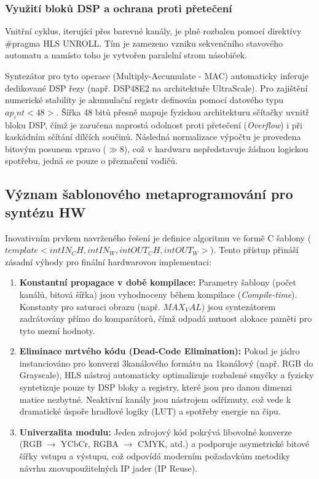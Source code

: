 \subsubsection{Využití bloků DSP a ochrana proti přetečení
}
Vnitřní cyklus, iterující přes barevné kanály, je plně rozbalen pomocí direktivy \#pragma HLS UNROLL. Tím je zamezeno vzniku sekvenčního stavového automatu a namísto toho je vytvořen paralelní strom násobiček.


Syntezátor pro tyto operace (Multiply-Accumulate - MAC) automaticky inferuje dedikované DSP řezy (např. DSP48E2 na architektuře UltraScale\+). Pro zajištění numerické stability je akumulační registr definován pomocí datového typu $ap_int<48>$. Šířka 48 bitů přesně mapuje fyzickou architekturu sčítačky uvnitř bloku DSP, čímž je zaručena naprostá odolnost proti přetečení (\textit{Overflow}) i při kaskádním sčítání dílčích součinů. Následná normalizace výpočtu je provedena bitovým posunem vpravo ($\gg 8$), což v hardwaru nepředstavuje žádnou logickou spotřebu, jedná se pouze o přeznačení vodičů.

\subsection{Význam šablonového metaprogramování pro syntézu HW}
Inovativním prvkem navrženého řešení je definice algoritmu ve formě C\+\+ šablony ($template <int IN_CH, int IN_W, int OUT_CH, int OUT_W>$). Tento přístup přináší zásadní výhody pro finální hardwarovou implementaci:

\begin{enumerate}
    \item \textbf{Konstantní propagace v době kompilace:} Parametry šablony (počet kanálů, bitová šířka) jsou vyhodnoceny během kompilace (\textit{Compile-time}). Konstanty pro saturaci obrazu (např. $MAX_VAL$) jsou syntezátorem zadrátovány přímo do komparátorů, čímž odpadá nutnost alokace paměti pro tyto mezní hodnoty.
    \item \textbf{Eliminace mrtvého kódu (Dead-Code Elimination):} Pokud je jádro instanciováno pro konverzi 3kanálového formátu na 1kanálový (např. RGB do Grayscale), HLS nástroj automaticky optimalizuje rozbalené smyčky a fyzicky syntetizuje pouze ty DSP bloky a registry, které jsou pro danou dimenzi matice nezbytné. Neaktivní kanály jsou nástrojem odříznuty, což vede k dramatické úspoře hradlové logiky (LUT) a spotřeby energie na čipu.
    \item \textbf{Univerzalita modulu:} Jeden zdrojový kód pokrývá libovolné konverze (RGB $\rightarrow$ YCbCr, RGBA $\rightarrow$ CMYK, atd.) a podporuje asymetrické bitové šířky vstupu a výstupu, což odpovídá moderním požadavkům metodiky návrhu znovupoužitelných IP jader (IP Reuse).
\end{enumerate}


